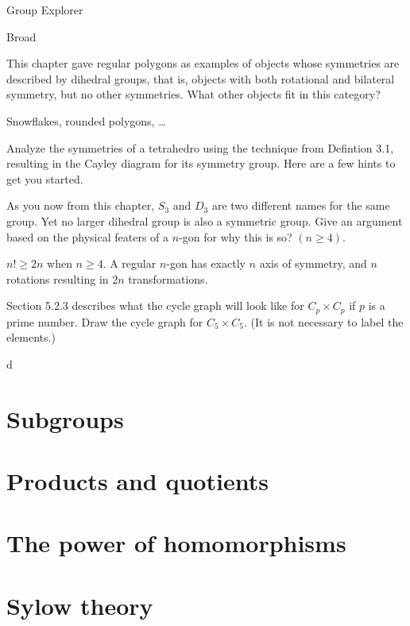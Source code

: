 \documentclass[11pt]{exam}
\begin{document}
\begin{questions}
	
	\question Group Explorer
	
	\question Broad
	
	\question This chapter gave regular polygons as examples of objects whose symmetries are described by dihedral groups, that is, objects with both rotational and bilateral symmetry, but no other symmetries. What other objects fit in this category?
	\begin{solution}
		\par Snowflakes, rounded polygons, \ldots
	\end{solution}
	
	\question Analyze the symmetries of a tetrahedro using the technique from Defintion 3.1, resulting in the Cayley diagram for its symmetry group. Here are a few hints to get you started.
	
	\question As you now from this chapter, $S_3$ and $D_3$ are two different names for the same group. Yet no larger dihedral group is also a symmetric group. Give an argument based on the physical featers of a $n$-gon for why this is so? $(n\geqslant 4)$.
	\begin{solution}
		\par $n! \geqslant 2n$ when $n\geqslant 4$. A regular $n$-gon has exactly $n$ axis of symmetry, and $n$ rotations resulting in $2n$ transformations.
	\end{solution}
	
	\question Section 5.2.3 describes what the cycle graph will look like for $C_p\times C_p$ if $p$ is a prime number. Draw the cycle graph for $C_5\times C_5$. (It is not necessary to label the elements.)
	\begin{solution}
		\par d
	\end{solution}


\end{questions}


\section{Subgroups}

\section{Products and quotients}


\section{The power of homomorphisms}

\section{Sylow theory}
\end{document}
